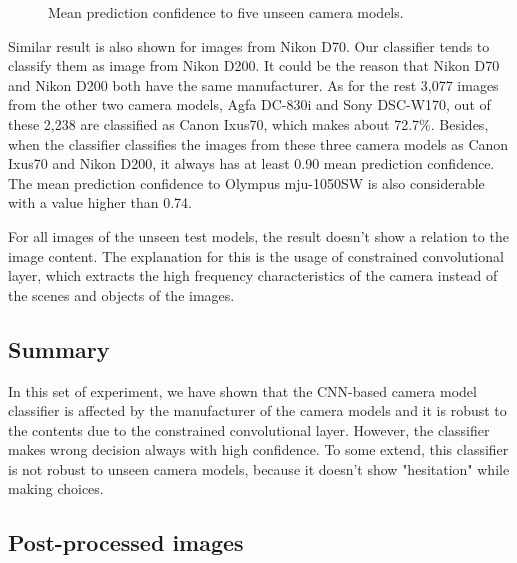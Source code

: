 \documentclass[a4paper, 9pt, twocolumn]{extarticle}
\begin{document}
\begin{figure}
	\centering
	\resizebox{!}{!}{
		{}
	}
	\caption{Mean prediction confidence to five unseen camera models.}
	\label{fig:unseen confidence}
\end{figure}

Similar result is also shown for images from Nikon D70. Our classifier tends to classify them as image from Nikon D200. It could be the reason that Nikon D70 and Nikon D200 both have the same manufacturer. As for the rest 3,077 images from the other two camera models, Agfa DC-830i and Sony DSC-W170, out of these 2,238 are classified as Canon Ixus70, which makes about 72.7\%. Besides, when the classifier classifies the images from these three camera models as Canon Ixus70 and Nikon D200, it always has at least 0.90 mean prediction confidence. The mean prediction confidence to Olympus mju-1050SW is also considerable with a value higher than 0.74.

For all images of the unseen test models, the result doesn't show a relation to the image content. The explanation for this is the usage of constrained convolutional layer, which extracts the high frequency characteristics of the camera instead of the scenes and objects of the images.

\subsection*{Summary}
\label{section:unseen summary}

In this set of experiment, we have shown that the CNN-based camera model classifier is affected by the manufacturer of the camera models and it is robust to the contents due to the constrained convolutional layer. However, the classifier makes wrong decision always with high confidence. To some extend, this classifier is not robust to unseen camera models, because it doesn't show "hesitation" while making choices.

\subsection{Post-processed images}
\label{section:post-pro	cessed}
\end{document}
